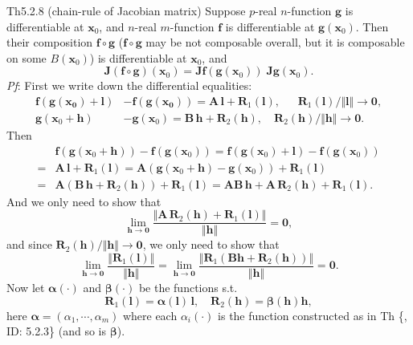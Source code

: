 \documentclass{article}
\begin{document}
\begin{Th}{Th5.2.8 (chain-rule of Jacobian matrix)}
    Suppose $p$-real $n$-function $\pmb{g}$ is differentiable at $\pmb{x}_0$, and $n$-real $m$-function $\pmb{f}$ is differentiable at $\pmb{g}(\pmb{x}_0)$. Then their composition $\pmb{f}\circ\pmb{g}$ ($\pmb{f}\circ\pmb{g}$ may be not composable overall, but it is composable on some $B(\pmb{x}_0)$) is differentiable at $\pmb{x}_0$, and
    $$ \pmb{J}(\pmb{f}\circ\pmb{g})(\pmb{x}_0) = \pmb{Jf}(\pmb{g}(\pmb{x}_0))\;\pmb{Jg}(\pmb{x}_0). $$
    \tcblower
    \textit{Pf}: First we write down the differential equalities:
    $$ 
    \begin{aligned}
        \pmb{f}(\pmb{g}(\pmb{x_0}) + \pmb{l}) &- \pmb{f}(\pmb{g}(\pmb{x_0})) = \pmb{A\,l} + \pmb{R}_1(\pmb{l}), \quad\;\; \pmb{R}_1(\pmb{l})/\Vert\pmb{l}\Vert\rightarrow\pmb{0},\\
        \pmb{g}(\pmb{x}_0 + \pmb{h}) &- \pmb{g}(\pmb{x}_0) = \pmb{B\,h} + \pmb{R}_2(\pmb{h}), \quad \pmb{R}_2(\pmb{h})/\Vert\pmb{h}\Vert\rightarrow\pmb{0}.
    \end{aligned}
    $$
    Then
    $$ 
    \begin{aligned}
        & \pmb{f}(\pmb{g}(\pmb{x}_0 + \pmb{h})) - \pmb{f}(\pmb{g}(\pmb{x}_0)) = \pmb{f}(\pmb{g}(\pmb{x}_0) + \pmb{l}) - \pmb{f}(\pmb{g}(\pmb{x}_0)) \\
        = & \pmb{A\,l} + \pmb{R}_1(\pmb{l}) = \pmb{A}(\pmb{g}(\pmb{x}_0 + \pmb{h}) - \pmb{g}(\pmb{x}_0)) + \pmb{R}_1(\pmb{l}) \\
        = & \pmb{A}(\pmb{B\,h} + \pmb{R}_2(\pmb{h})) + \pmb{R}_1(\pmb{l}) = \pmb{AB\,h} + \pmb{A\,R}_2(\pmb{h}) + \pmb{R}_1(\pmb{l}).
    \end{aligned}
    $$
    And we only need to show that 
    $$ \lim_{\pmb{h}\to\pmb{0}}\frac{\Vert\pmb{A\,R}_2(\pmb{h}) + \pmb{R}_1(\pmb{l})\Vert}{\Vert\pmb{h}\Vert} = \pmb{0}, $$
    and since $\pmb{R}_2(\pmb{h})/\Vert\pmb{h}\Vert\rightarrow\pmb{0}$, we only need to show that
    \begin{equation}
        \lim\limits_{\pmb{h}\to\pmb{0}}\frac{\Vert\pmb{R}_1(\pmb{l})\Vert}{\Vert\pmb{h}\Vert} = \lim\limits_{\pmb{h}\to\pmb{0}}\frac{\Vert\pmb{R}_1(\pmb{Bh} + \pmb{R}_2(\pmb{h}))\Vert}{\Vert\pmb{h}\Vert} = \pmb{0}.
        \tag{1}
    \end{equation}
    Now let $\pmb{\alpha}(\cdot)$ and $\pmb{\beta}(\cdot)$ be the functions s.t. 
    $$ \pmb{R}_1(\pmb{l}) = \pmb{\alpha}(\pmb{l})\,\pmb{l},\quad \pmb{R}_2(\pmb{h}) = \pmb{\beta}(\pmb{h})\pmb{h}, $$
    here $\pmb{\alpha} = (\alpha_1, \cdots, \alpha_m)$ where each $\alpha_i(\cdot)$ is the function constructed as in Th \{, ID: 5.2.3\} (and so is $\pmb{\beta}$). 

\end{Th}
\end{document}
